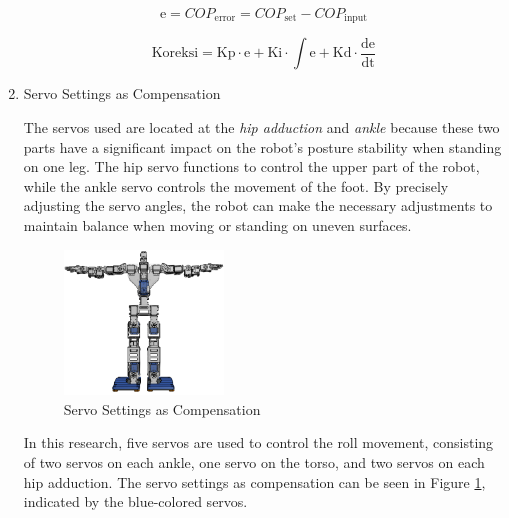 \begin{enumerate}[label=\Alph*.]
    \begin{equation}
      \mathrm{e} = COP_{\mathrm{error}} = COP_{\mathrm{set}} - COP_{\mathrm{input}}
      \label{eq:Error_PID}
    \end{equation}

    \begin{equation}
      \mathrm{Koreksi} = \mathrm{Kp} \cdot \mathrm{e} + \mathrm{Ki} \cdot \int \mathrm{e} + \mathrm{Kd} \cdot \frac{\mathrm{de}}{\mathrm{dt}}
      \label{eq:Koreksi_PID}
    \end{equation}

    \item Servo Settings as Compensation
    \label{subsec:servosettings}

    \hspace*{1em} The servos used are located at the \textit{hip adduction} and \textit{ankle} because these two parts have a significant impact on the robot's posture stability when standing on one leg. The hip servo functions to control the upper part of the robot, while the ankle servo controls the movement of the foot. By precisely adjusting the servo angles, the robot can make the necessary adjustments to maintain balance when moving or standing on uneven surfaces.

    \begin{figure} [h] \centering
      \includegraphics[width=0.4\textwidth]{gambar/controlled_servo.png}
      \caption{Servo Settings as Compensation}
      \label{fig:Controlled_Servo}
    \end{figure}

    \hspace*{1em} In this research, five servos are used to control the roll movement, consisting of two servos on each ankle, one servo on the torso, and two servos on each hip adduction. The servo settings as compensation can be seen in Figure \ref{fig:Controlled_Servo}, indicated by the blue-colored servos.
\end{enumerate}